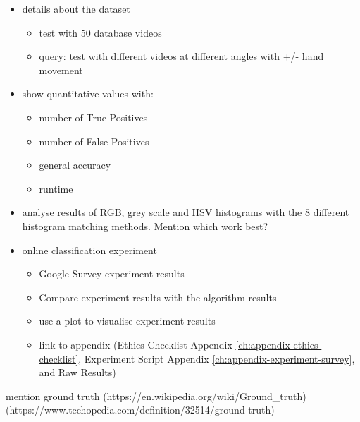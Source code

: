 \begin{itemize}
    \item details about the dataset
    \begin{itemize}
        \item test with 50 database videos
        \item query: test with different videos at different angles with +/- hand movement
    \end{itemize}
    
    \item show quantitative values with:
    \begin{itemize}
        \item number of True Positives 
        \item number of False Positives
        \item general accuracy
        \item runtime
    \end{itemize}
    
    \item analyse results of RGB, grey scale and HSV histograms with the 8 different histogram matching methods. Mention which work best?
    
    \item online classification experiment
    \begin{itemize}
        \item Google Survey experiment results 
        \item Compare experiment results with the algorithm results
        \item use a plot to visualise experiment results
        \item link to appendix (Ethics Checklist Appendix \ref{ch:appendix-ethics-checklist}, Experiment Script Appendix \ref{ch:appendix-experiment-survey}, and Raw Results)
    \end{itemize}
\end{itemize}

mention ground truth (https://en.wikipedia.org/wiki/Ground\_truth) (https://www.techopedia.com/definition/32514/ground-truth)